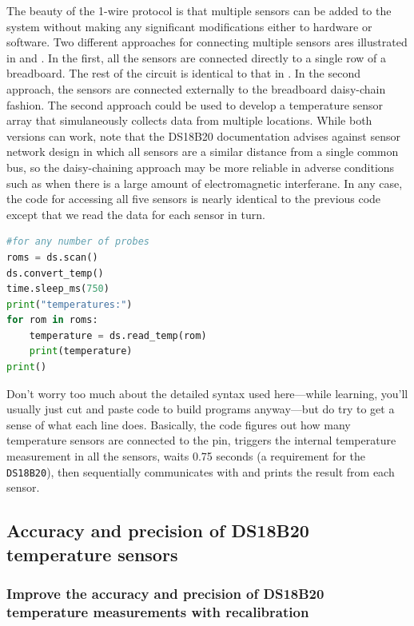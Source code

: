 The beauty of the 1-wire protocol is that multiple sensors can be added to the system without making any significant modifications either to hardware or software.
Two different approaches for connecting multiple sensors ares illustrated in  and . 
In the first, all the sensors are connected directly to a single row of a breadboard.  
The rest of the circuit is identical to that in . 
In the second approach, the sensors are connected externally to the breadboard daisy-chain fashion.  
The second approach could be used to develop a temperature sensor array that simulaneously collects data from multiple locations.
While both versions can work, note that the DS18B20 documentation advises against sensor network design in which all sensors are a similar distance from a single common bus, so the daisy-chaining approach may be more reliable in adverse conditions such as when there is a large amount of electromagnetic interferane.
In any case, the code for accessing all five sensors is nearly identical to the previous code except that we read the data for each sensor in turn. 

\begin{lstlisting}[language=Python]
#for any number of probes
roms = ds.scan()
ds.convert_temp()
time.sleep_ms(750)
print("temperatures:")  
for rom in roms:
	temperature = ds.read_temp(rom)
	print(temperature)
print()
\end{lstlisting}

Don’t worry too much about the detailed syntax used here—while learning, you’ll usually just cut and paste code to build programs anyway—but do try to get a sense of what each line does.
Basically, the code figures out how many temperature sensors are connected to the pin, triggers the internal temperature measurement in all the sensors,  waits 0.75 seconds (a requirement for the \texttt{DS18B20}), then sequentially communicates with and prints the result from each sensor.


\subsection{\color{gray} Accuracy and precision of DS18B20 temperature sensors \color{black}}
\subsubsection{\color{gray} Improve the accuracy and precision of DS18B20 temperature measurements with recalibration \color{black}}
